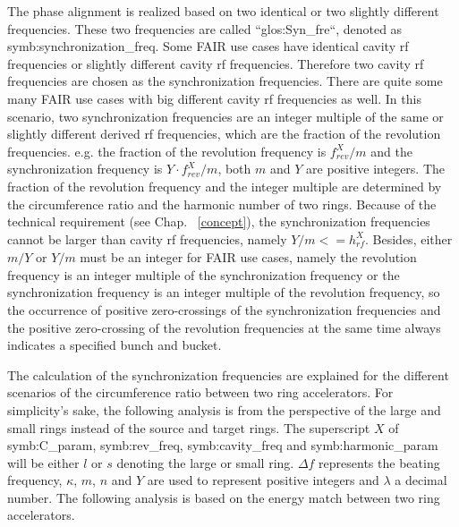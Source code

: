 The phase alignment is realized based on two identical or two slightly different frequencies. These two frequencies are called ``\gls{glos:Syn_fre}``, denoted as \gls{symb:synchronization_freq}. Some FAIR use cases have identical cavity rf frequencies or slightly different cavity rf frequencies. Therefore two cavity rf frequencies are chosen as the synchronization frequencies. There are quite some many FAIR use cases with big different cavity rf frequencies as well. In this scenario, two synchronization frequencies are an integer multiple of the same or slightly different derived rf frequencies, which are the fraction of the revolution frequencies. e.g. the fraction of the revolution frequency is $f_\mathit{rev}^{X}/m$ and the synchronization frequency is $Y\cdot f_\mathit{rev}^{X}/m$, both $m$ and $Y$ are positive integers. The fraction of the revolution frequency and the integer multiple are determined by the circumference ratio and the harmonic number of two rings. Because of the technical requirement (see Chap. ~\ref{concept}), the synchronization frequencies cannot be larger than cavity rf frequencies, namely $Y/m <=h^X_\mathit{rf}$. Besides, either $m/Y$ or $Y/m$ must be an integer for FAIR use cases, namely the revolution frequency is an integer multiple of the synchronization frequency or the synchronization frequency is an integer multiple of the revolution frequency, so the occurrence of positive zero-crossings of the synchronization frequencies and the positive zero-crossing of the revolution frequencies at the same time always indicates a specified bunch and bucket.

The calculation of the synchronization frequencies are explained for the different scenarios of the circumference ratio between two ring accelerators. For simplicity's sake, the following analysis is from the perspective of the large and small rings instead of the source and target rings. The superscript $X$ of \gls{symb:C_param}, \gls{symb:rev_freq}, \gls{symb:cavity_freq} and \gls{symb:harmonic_param} will be either $l$ or $s$ denoting the large or small ring. $\Delta f$ represents the beating frequency, $\kappa$, $m$, $n$ and $Y$ are used to represent positive integers and $\lambda$ a decimal number. The following analysis is based on the energy match between two ring accelerators.


